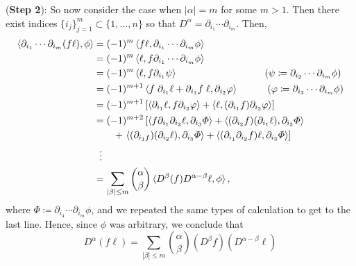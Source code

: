 \documentclass{article}
\begin{document}
	(\textbf{Step 2}): So now consider the case when $|\alpha| = m$ for some $m > 1$. Then there exist indices $\{i_{j}\}_{j = 1}^{m} \subset \{1, \ldots, n\}$ so that $D^{\alpha} = \partial_{i_{1}}\dotsm \partial_{i_{m}}$. Then, 
	\begin{align*}
		\begin{split}
			\braket{\partial_{i_{1}}\dotsm \partial_{i_{m}}(f\ell), \phi} &= (-1)^{m}\braket{f\ell, \partial_{i_{1}}\dotsm \partial_{i_{m}}\phi} \\
			&= (-1)^{m}\braket{\ell, f\partial_{i_{1}}\dotsm \partial_{i_{m}}\phi} \\
			&= (-1)^{m}\braket{\ell, f \partial_{i_{1}}\psi} \qquad \qquad \qquad \qquad \quad  (\psi \coloneqq \partial_{i_{2}}\dotsm \partial_{i_{m}}\phi) \\
			&= (-1)^{m + 1}\braket{f\;\partial_{i_{1}}\ell + \partial_{i_{1}}f\; \ell, \partial_{i_{2}}\varphi} \qquad \quad (\varphi \coloneq \partial_{i_{3}}\dotsm \partial_{i_{m}}\phi) \\
			&= (-1)^{m + 1}\left[\braket{\partial_{i_{1}}\ell,f\partial_{i_{2}}\varphi} + \braket{\ell, (\partial_{i_{1}}f)\partial_{i_{2}}\varphi}\right] \\
			&= (-1)^{m + 2}\left[\braket{f\partial_{i_{1}}\partial_{i_{2}}\ell, \partial_{i_{3}}\varPhi} + \braket{(\partial_{i_{2}}f)(\partial_{i_{1}}\ell),\partial_{i_{3}}\varPhi}\right. \\
			&\qquad + \left.\braket{(\partial_{i_{1}f})(\partial_{i_{2}}\ell), \partial_{i_{3}}\varPhi} + \braket{(\partial_{i_{1}}\partial_{i_{2}}f)\ell,\partial_{i_{3}}\varPhi}\right] \\
			&\hspace{6pt}\vdots  \\
			&= \sum_{|\beta| \leq m}\binom{\alpha}{\beta}\braket{D^{\beta}(f)D^{\alpha-\beta}\ell, \phi}, 
		\end{split}
	\end{align*}
	where $\varPhi \coloneqq \partial_{i_{4}}\dotsm \partial_{i_{m}}\phi$, and we repeated the same types of calculation to get to the last line. Hence, since $\phi$ was arbitrary, we conclude that 
	\begin{equation*}
		D^{\alpha}(f\ell) = \sum_{|\beta| \leq m}\binom{\alpha}{\beta}(D^{\beta}f)(D^{\alpha - \beta}\ell)
	\end{equation*}
	
\end{document}
